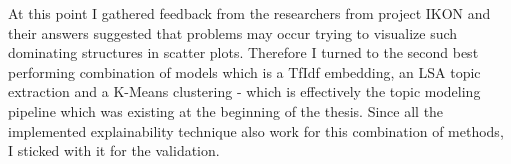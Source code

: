 At this point I gathered feedback from the researchers from project IKON and their answers suggested that problems may occur trying to visualize such dominating structures in scatter plots. 
Therefore I turned to the second best performing combination of models which is a TfIdf embedding, an LSA topic extraction and a K-Means clustering - which is effectively the topic modeling pipeline which was existing at the beginning of the thesis. Since all the implemented explainability technique also work for this combination of methods, I sticked with it for the validation. 